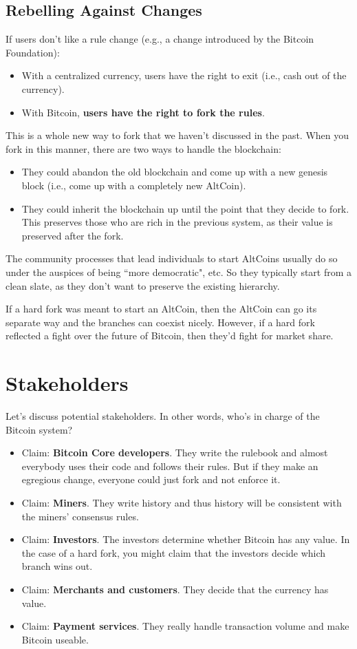 \documentclass[12pt]{article}
\begin{document}
\subsection*{Rebelling Against Changes}

If users don't like a rule change (e.g., a change introduced by the Bitcoin Foundation):
\begin{itemize}
\item With a centralized currency, users have the right to exit (i.e., cash out of the currency).
\item With Bitcoin, \textbf{users have the right to fork the rules}.
\end{itemize}

This is a whole new way to fork that we haven't discussed in the past. When you fork in this manner, there are two ways to handle the blockchain:
\begin{itemize}
\item They could abandon the old blockchain and come up with a new genesis block (i.e., come up with a completely new AltCoin).
\item They could inherit the blockchain up until the point that they decide to fork. This preserves those who are rich in the previous system, as their value is preserved after the fork.
\end{itemize}

The community processes that lead individuals to start AltCoins usually do so under the auspices of being ``more democratic", etc. So they typically start from a clean slate, as they don't want to preserve the existing hierarchy.

If a hard fork was meant to start an AltCoin, then the AltCoin can go its separate way and the branches can coexist nicely. However, if a hard fork reflected a fight over the future of Bitcoin, then they'd fight for market share.

\section*{Stakeholders}

Let's discuss potential stakeholders. In other words, who's in charge of the Bitcoin system?

\begin{itemize}
\item Claim: \textbf{Bitcoin Core developers}. They write the rulebook and almost everybody uses their code and follows their rules. But if they make an egregious change, everyone could just fork and not enforce it.
\item Claim: \textbf{Miners}. They write history and thus history will be consistent with the miners' consensus rules.
\item Claim: \textbf{Investors}. The investors determine whether Bitcoin has any value. In the case of a hard fork, you might claim that the investors decide which branch wins out.
\item Claim: \textbf{Merchants and customers}. They decide that the currency has value.
\item Claim: \textbf{Payment services}. They really handle transaction volume and make Bitcoin useable.
\end{itemize}
\end{document}
